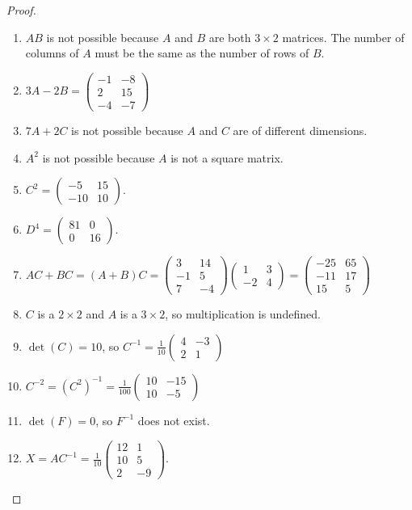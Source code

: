 \documentclass[../main.tex]{subfiles}
\begin{document}
\begin{proof}
\
\begin{enumerate}
\item $AB$ is not possible because $A$ and $B$ are both $3\times 2$ matrices. The number of columns of $A$ must be the same as the number of rows of $B$.
\item $3A-2B = \begin{pmatrix}-1 & -8\\ 2 & 15\\ -4 & -7 \end{pmatrix}$
\item $7A+2C$ is not possible because $A$ and $C$ are of different dimensions.
\item $A^2$ is not possible because $A$ is not a square matrix.
\item $C^2 = \begin{pmatrix} -5 & 15 \\ -10 & 10\end{pmatrix}$.
\item $D^4 = \begin{pmatrix} 81 & 0 \\ 0 & 16\end{pmatrix}$. 
\item $AC+BC = (A+B)C = \begin{pmatrix} 3 & 14 \\ -1 & 5 \\ 7 & -4 \end{pmatrix} \begin{pmatrix} 1 & 3 \\ -2 & 4 \end{pmatrix} = \begin{pmatrix} -25 & 65 \\ -11 & 17 \\ 15 & 5 \end{pmatrix}$
\item $C$ is a $2\times 2$ and $A$ is a $3\times 2$, so multiplication is undefined.
\item $\det(C) = 10$, so $C^{-1} = \frac{1}{10}\begin{pmatrix} 4 & -3 \\ 2 & 1 \end{pmatrix}$
\item $C^{-2} = (C^2)^{-1} = \frac{1}{100}\begin{pmatrix}10 & -15 \\ 10 & -5\end{pmatrix}$
\item $\det(F) = 0$, so $F^{-1}$ does not exist. 
\item $X = AC^{-1} = \frac{1}{10}\begin{pmatrix}12 & 1\\10 & 5\\ 2 & -9\end{pmatrix}$.
\end{enumerate}
\end{proof}
\end{document}
